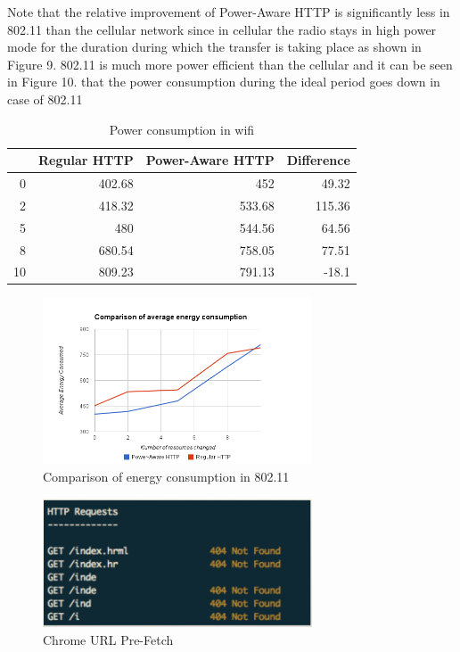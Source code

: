 \documentclass{sigplanconf}
\begin{document}
Note that the relative improvement of Power-Aware HTTP is significantly less in 802.11 than the cellular network since in cellular the radio stays in high power mode for the duration during which the transfer is taking place as shown in Figure 9. 802.11 is much more power efficient than the cellular and it can be seen in Figure 10. that the power consumption during the ideal period goes down in case of 802.11


\begin{table}[htbp]
\centering
\caption{Power consumption in wifi}
\begin{tabular}{|r|r|r|r|}
\hline
\multicolumn{1}{|l|}{} & \multicolumn{1}{l|}{Regular HTTP} & \multicolumn{1}{l|}{Power-Aware HTTP} & \multicolumn{1}{l|}{Difference} \\ \hline
0 & 402.68 & 452 & 49.32 \\ \hline
2 & 418.32 & 533.68 & 115.36 \\ \hline
5 & 480 & 544.56 & 64.56 \\ \hline
8 & 680.54 & 758.05 & 77.51 \\ \hline
10 & 809.23 & 791.13 & -18.1 \\ \hline
\end{tabular}
\label{}
\end{table}

\begin{figure}[ht!]
\centering
\includegraphics[width=80mm]{avg_energy_wifi.png}
\caption{Comparison of energy consumption in 802.11}
\label{fig:sp_gd_mnist}
\end{figure}



\begin{figure}[ht!]
\centering
\includegraphics[width=80mm]{chrome}
\caption{Chrome URL Pre-Fetch}
\label{fig:sp_gd_mnist}
\end{figure}
\end{document}

